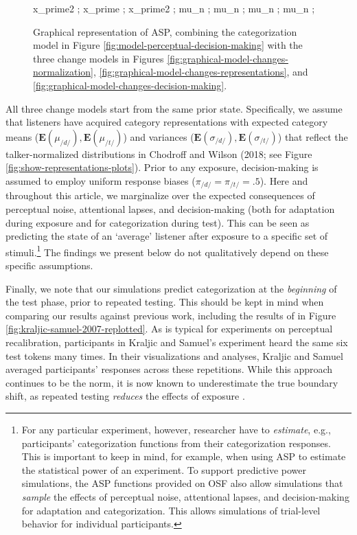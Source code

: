 \documentclass[
  11pt,
  man,floatsintext]{apa6}
\begin{document}
\begin{figure}
{%
     {x_prime2} ; %
     {x_prime} ; %
     {x_prime2} ; %
     {mu_n} ; %
     {mu_n} ; %
     {mu_n} ; %
     {mu_n} ; %
}
\caption{Graphical representation of ASP, combining the categorization model in Figure \ref{fig:model-perceptual-decision-making} with the three change models in Figures \ref{fig:graphical-model-changes-normalization}, \ref{fig:graphical-model-changes-representations}, and \ref{fig:graphical-model-changes-decision-making}.}\label{fig:graphical-model-all}
\end{figure}

All three change models start from the same prior state. Specifically, we assume that listeners have acquired category representations with expected category means (\(\mathbf{E}(\mu_{/d/}), \mathbf{E}(\mu_{/t/})\)) and variances (\(\mathbf{E}(\sigma_{/d/}), \mathbf{E}(\sigma_{/t/})\)) that reflect the talker-normalized distributions in Chodroff and Wilson (2018; see Figure \ref{fig:show-representations-plots}). Prior to any exposure, decision-making is assumed to employ uniform response biases (\(\pi_{/d/}=\pi_{/t/}=.5\)). Here and throughout this article, we marginalize over the expected consequences of perceptual noise, attentional lapses, and decision-making (both for adaptation during exposure and for categorization during test). This can be seen as predicting the state of an `average' listener after exposure to a specific set of stimuli.\footnote{For any particular experiment, however, researcher have to \emph{estimate}, e.g., participants' categorization functions from their categorization responses. This is important to keep in mind, for example, when using ASP to estimate the statistical power of an experiment. To support predictive power simulations, the ASP functions provided on OSF also allow simulations that \emph{sample} the effects of perceptual noise, attentional lapses, and decision-making for adaptation and categorization. This allows simulations of trial-level behavior for individual participants.} The findings we present below do not qualitatively depend on these specific assumptions.

Finally, we note that our simulations predict categorization at the \emph{beginning} of the test phase, prior to repeated testing. This should be kept in mind when comparing our results against previous work, including the results of \textcite{kraljic-samuel2007} in Figure \ref{fig:kraljic-samuel-2007-replotted}. As is typical for experiments on perceptual recalibration, participants in Kraljic and Samuel's experiment heard the same six test tokens many times. In their visualizations and analyses, Kraljic and Samuel averaged participants' responses across these repetitions. While this approach continues to be the norm, it is now known to underestimate the true boundary shift, as repeated testing \emph{reduces} the effects of exposure \autocites{mitterer2011-perceptual-recalibration,liu-jaeger2018,liu-jaeger2019,scharenborg-janse2013,zheng-samuel2023}[for early discussion, see][p.~11]{norris2003}.
\end{document}
